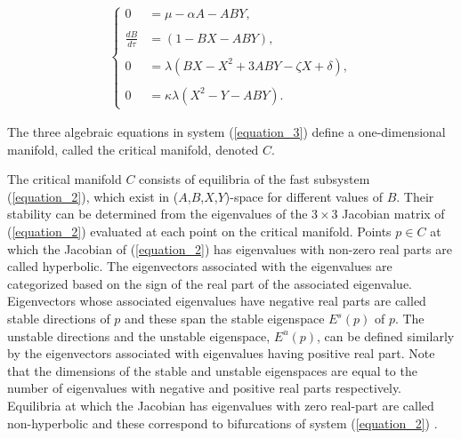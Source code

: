 \documentclass{ws-ijbc}
\begin{document}
 \begin{equation}
\begin{aligned}
\begin{cases}
0 &= \mu - \alpha A - ABY, \\ \\
\frac{dB}{d\tau} &= (1-BX - ABY), \\ \\
0 &= \lambda (BX - X^2 +3ABY - \zeta X + \delta), \\ \\
0 &= \kappa \lambda(X^2 - Y - ABY).
\end{cases}
\end{aligned}
\label{equation_3}
\end{equation}
    
\noindent
The three algebraic equations in system (\ref{equation_3}) define a one-dimensional manifold, called the critical manifold, denoted $C$.

The critical manifold $C$ consists of equilibria of the fast subsystem (\ref{equation_2}), which exist in ($A$,$B$,$X$,$Y$)-space for different values of $B$.  Their stability can be determined from the eigenvalues of the $3\times3$ Jacobian matrix of (\ref{equation_2}) evaluated at each point on the critical manifold.  Points $p \in C$ at which the Jacobian of (\ref{equation_2}) has eigenvalues with non-zero real parts are called hyperbolic.  The eigenvectors associated with the eigenvalues are categorized based on the sign of the real part of the associated eigenvalue.  Eigenvectors whose associated eigenvalues have negative real parts are called stable directions of $p$ and these span the stable eigenspace $E^{s}(p)$ of $p$.  The unstable directions and the unstable eigenspace, $E^{u}(p)$, can be defined similarly by the eigenvectors associated with eigenvalues having positive real part.  Note that the dimensions of the stable and unstable eigenspaces are equal to the number of eigenvalues with negative and positive real parts respectively.  Equilibria at which the Jacobian has eigenvalues with zero real-part are called non-hyperbolic and these correspond to bifurcations of system (\ref{equation_2}) \cite{The_Kuz} .
\end{document}
